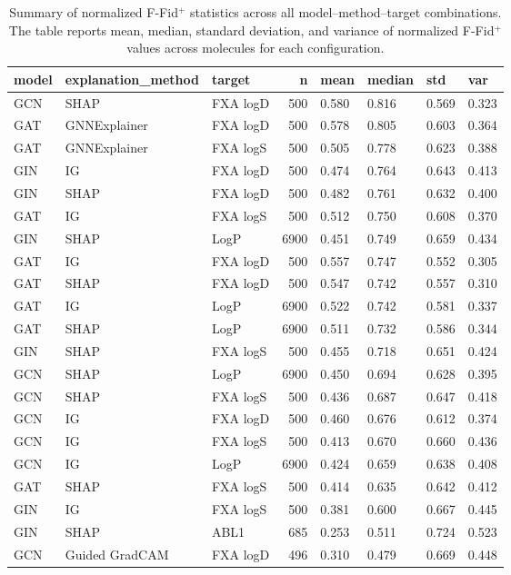 \begin{table}
\caption{Summary of normalized F-Fid$^+$ statistics across all model--method--target combinations. The table reports mean, median, standard deviation, and variance of normalized F-Fid$^+$ values across molecules for each configuration.}
\label{tab:supp_fid_variation}
\begin{tabular}{lllrllll}
\toprule
model & explanation_method & target & n & mean & median & std & var \\
\midrule
GCN & SHAP & FXA logD & 500 & 0.580 & 0.816 & 0.569 & 0.323 \\
GAT & GNNExplainer & FXA logD & 500 & 0.578 & 0.805 & 0.603 & 0.364 \\
GAT & GNNExplainer & FXA logS & 500 & 0.505 & 0.778 & 0.623 & 0.388 \\
GIN & IG & FXA logD & 500 & 0.474 & 0.764 & 0.643 & 0.413 \\
GIN & SHAP & FXA logD & 500 & 0.482 & 0.761 & 0.632 & 0.400 \\
GAT & IG & FXA logS & 500 & 0.512 & 0.750 & 0.608 & 0.370 \\
GIN & SHAP & LogP & 6900 & 0.451 & 0.749 & 0.659 & 0.434 \\
GAT & IG & FXA logD & 500 & 0.557 & 0.747 & 0.552 & 0.305 \\
GAT & SHAP & FXA logD & 500 & 0.547 & 0.742 & 0.557 & 0.310 \\
GAT & IG & LogP & 6900 & 0.522 & 0.742 & 0.581 & 0.337 \\
GAT & SHAP & LogP & 6900 & 0.511 & 0.732 & 0.586 & 0.344 \\
GIN & SHAP & FXA logS & 500 & 0.455 & 0.718 & 0.651 & 0.424 \\
GCN & SHAP & LogP & 6900 & 0.450 & 0.694 & 0.628 & 0.395 \\
GCN & SHAP & FXA logS & 500 & 0.436 & 0.687 & 0.647 & 0.418 \\
GCN & IG & FXA logD & 500 & 0.460 & 0.676 & 0.612 & 0.374 \\
GCN & IG & FXA logS & 500 & 0.413 & 0.670 & 0.660 & 0.436 \\
GCN & IG & LogP & 6900 & 0.424 & 0.659 & 0.638 & 0.408 \\
GAT & SHAP & FXA logS & 500 & 0.414 & 0.635 & 0.642 & 0.412 \\
GIN & IG & FXA logS & 500 & 0.381 & 0.600 & 0.667 & 0.445 \\
GIN & SHAP & ABL1 & 685 & 0.253 & 0.511 & 0.724 & 0.523 \\
GCN & Guided GradCAM & FXA logD & 496 & 0.310 & 0.479 & 0.669 & 0.448 \\

\end{tabular}
\end{table}
